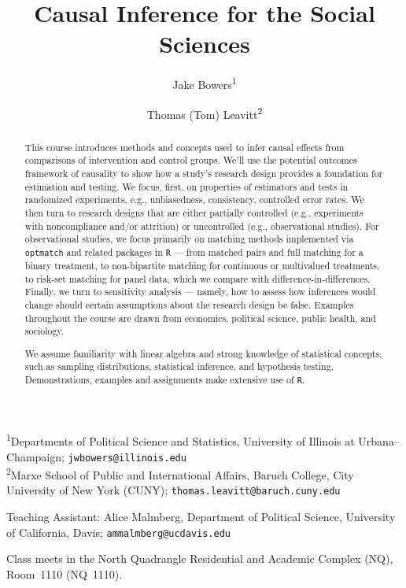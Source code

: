 \documentclass[12pt]{article}
\title{Causal Inference for the Social Sciences}
\author{%
  Jake Bowers\textsuperscript{1} \and
  Thomas (Tom) Leavitt\textsuperscript{2}
}
\begin{document}
\pagestyle{myfancy}
\maketitle

\begin{center}\small
  \textsuperscript{1}Departments of Political Science and Statistics,
  University of Illinois at Urbana–Champaign; \texttt{jwbowers@illinois.edu}\\
  \textsuperscript{2}Marxe School of Public and International Affairs,
  Baruch College, City University of New York (CUNY);
  \texttt{thomas.leavitt@baruch.cuny.edu}
\end{center}

\begin{center}\small
  Teaching Assistant: Alice Malmberg, Department of Political Science,
  University of California, Davis; \texttt{ammalmberg@ucdavis.edu}
\end{center}

\begin{center}\small
  Class meets in the North Quadrangle Residential and Academic Complex (NQ),
  Room~1110 (NQ~1110).
\end{center}

\begin{abstract}
\noindent This course introduces methods and concepts used to infer causal effects from comparisons of intervention and control groups. We'll use the potential outcomes framework of causality to show how a study's research design provides a foundation for estimation and testing. We focus, first, on properties of estimators and tests in randomized experiments, e.g., unbiasedness, consistency, controlled error rates. We then turn to research designs that are either partially controlled (e.g., experiments with noncompliance and/or attrition) or uncontrolled (e.g., observational studies). For observational studies, we focus primarily on matching methods implemented via \texttt{optmatch} and related packages in \texttt{R} --- from matched pairs and full matching for a binary treatment, to non-bipartite matching for continuous or multivalued treatments, to risk-set matching for panel data, which we compare with difference-in-differences. Finally, we turn to sensitivity analysis --- namely, how to assess how inferences would change should certain assumptions about the research design be false. Examples throughout the course are drawn from economics, political science, public health, and sociology.

We assume familiarity with linear algebra and strong knowledge of
statistical concepts, such as sampling distributions, statistical
inference, and hypothesis testing. Demonstrations, examples and
assignments make extensive use of \texttt{R}.
\end{abstract}
\end{document}
